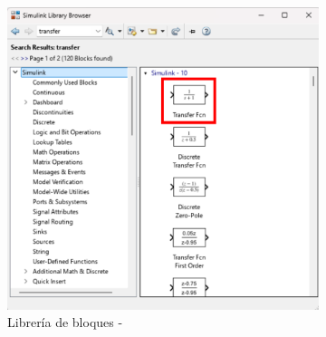 \begin{figure}[htbp]
    \centering
    \begin{subfigure}[b]{0.35\textwidth}
        \centering
        \includegraphics[width=\textwidth]{fig/Capitulo5/Caso_de_estudio_PID/Transfer_func.pdf}
        \caption{Librería de bloques -}
        \label{fig:bias_sim}
    \end{subfigure}
    \hfill
    \begin{subfigure}[b]{0.45\textwidth}
        \centering

\end{subfigure}
\end{figure}
